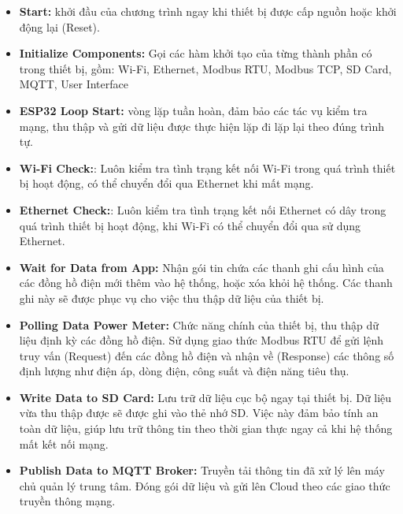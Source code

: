 \begin{itemize}
    \item \textbf{Start:} khởi đầu của chương trình ngay khi thiết bị được cấp nguồn hoặc khởi động lại (Reset).
    \item \textbf{Initialize Components:} Gọi các hàm khởi tạo của từng thành phần có trong thiết bị, gồm: Wi-Fi, Ethernet, Modbus RTU, Modbus TCP, SD Card, MQTT, User Interface
    \item \textbf{ESP32 Loop Start:} vòng lặp tuần hoàn, đảm bảo các tác vụ kiểm tra mạng, thu thập và gửi dữ liệu được thực hiện lặp đi lặp lại theo đúng trình tự.
    \item \textbf{Wi-Fi Check:}: Luôn kiểm tra tình trạng kết nối Wi-Fi trong quá trình thiết bị hoạt động, có thể chuyển đổi qua Ethernet khi mất mạng.
    \item \textbf{Ethernet Check:}: Luôn kiểm tra tình trạng kết nối Ethernet có dây trong quá trình thiết bị hoạt động, khi Wi-Fi có thể chuyển đổi qua sử dụng Ethernet.
    \item \textbf{Wait for Data from App:} Nhận gói tin chứa các thanh ghi cấu hình của các đồng hồ điện mới thêm vào hệ thống, hoặc xóa khỏi hệ thống. Các thanh ghi này 
    sẽ được phục vụ cho việc thu thập dữ liệu của thiết bị.
    \item \textbf{Polling Data Power Meter:} Chức năng chính của thiết bị, thu thập dữ liệu định kỳ các đồng hồ điện. Sử dụng giao thức Modbus RTU để gửi lệnh truy vấn (Request)
    đến các đồng hồ điện và nhận về (Response) các thông số định lượng như điện áp, dòng điện, công suất và điện năng tiêu thụ.
    \item \textbf{Write Data to SD Card:} Lưu trữ dữ liệu cục bộ ngay tại thiết bị. Dữ liệu vừa thu thập được sẽ được ghi vào thẻ nhớ SD. Việc này đảm bảo tính an toàn dữ liệu, 
    giúp lưu trữ thông tin theo thời gian thực ngay cả khi hệ thống mất kết nối mạng.
    \item \textbf{Publish Data to MQTT Broker:} Truyền tải thông tin đã xử lý lên máy chủ quản lý trung tâm. Đóng gói dữ liệu và gửi lên Cloud theo các giao thức truyền thông mạng. 
\end{itemize}

